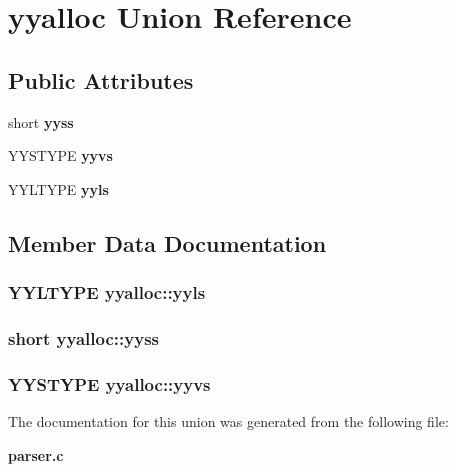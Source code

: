 \section{yyalloc  Union Reference}
\label{unionyyalloc}
\subsection*{Public Attributes}
\begin{CompactItemize}
\item 
short {\bf yyss}
\item 
YYSTYPE {\bf yyvs}
\item 
YYLTYPE {\bf yyls}
\end{CompactItemize}


\subsection{Member Data Documentation}
\subsubsection{\setlength{\rightskip}{0pt plus 5cm}YYLTYPE yyalloc::yyls}\label{unionyyalloc_m2}


\subsubsection{\setlength{\rightskip}{0pt plus 5cm}short yyalloc::yyss}\label{unionyyalloc_m0}


\subsubsection{\setlength{\rightskip}{0pt plus 5cm}YYSTYPE yyalloc::yyvs}\label{unionyyalloc_m1}




The documentation for this union was generated from the following file:\begin{CompactItemize}
\item 
{\bf parser.c}\end{CompactItemize}

